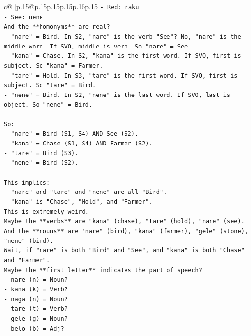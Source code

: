 \documentclass{article}
\begin{document}
{\begin{supertabular}{c@{$\;$}|p{.15\linewidth}@{}p{.15\linewidth}p{.15\linewidth}p{.15\linewidth}p{.15\linewidth}p{.15\linewidth}}
{{{\texttt{{-} Red: raku} \\
\texttt{{-} See: nene} \\
\texttt{And the **homonyms** are real?} \\
\texttt{{-} "nare" = Bird. In S2, "nare" is the verb "See"? No, "nare" is the middle word. If SVO, middle is verb. So "nare" = See.} \\
\texttt{{-} "kana" = Chase. In S2, "kana" is the first word. If SVO, first is subject. So "kana" = Farmer.} \\
\texttt{{-} "tare" = Hold. In S3, "tare" is the first word. If SVO, first is subject. So "tare" = Bird.} \\
\texttt{{-} "nene" = Bird. In S2, "nene" is the last word. If SVO, last is object. So "nene" = Bird.} \\
\\ 
\texttt{So:} \\
\texttt{{-} "nare" = Bird (S1, S4) AND See (S2).} \\
\texttt{{-} "kana" = Chase (S1, S4) AND Farmer (S2).} \\
\texttt{{-} "tare" = Bird (S3).} \\
\texttt{{-} "nene" = Bird (S2).} \\
\\ 
\texttt{This implies:} \\
\texttt{{-} "nare" and "tare" and "nene" are all "Bird".} \\
\texttt{{-} "kana" is "Chase", "Hold", and "Farmer".} \\
\texttt{This is extremely weird.} \\
\texttt{Maybe the **verbs** are "kana" (chase), "tare" (hold), "nare" (see).} \\
\texttt{And the **nouns** are "nare" (bird), "kana" (farmer), "gele" (stone), "nene" (bird).} \\
\texttt{Wait, if "nare" is both "Bird" and "See", and "kana" is both "Chase" and "Farmer".} \\
\texttt{Maybe the **first letter** indicates the part of speech?} \\
\texttt{{-} nare (n) = Noun?} \\
\texttt{{-} kana (k) = Verb?} \\
\texttt{{-} naga (n) = Noun?} \\
\texttt{{-} tare (t) = Verb?} \\
\texttt{{-} gele (g) = Noun?} \\
\texttt{{-} belo (b) = Adj?} \\
}}}
\end{supertabular}}
\end{document}
